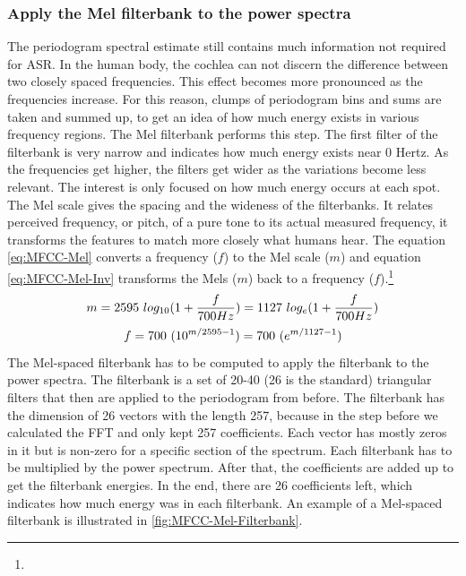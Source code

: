 \subsubsection{Apply the Mel filterbank to the power spectra}
The periodogram spectral estimate still contains much information not required for \gls{ASR}. In the human body, the cochlea can not discern the difference between two closely spaced frequencies. This effect becomes more pronounced as the frequencies increase. For this reason, clumps of periodogram bins and sums are taken and summed up, to get an idea of how much energy exists in various frequency regions.
\newline
\newline
The Mel filterbank performs this step. The first filter of the filterbank is very narrow and indicates how much energy exists near 0 Hertz. As the frequencies get higher, the filters get wider as the variations become less relevant. The interest is only focused on how much energy occurs at each spot. The Mel scale gives the spacing and the wideness of the filterbanks. It relates perceived frequency, or pitch, of a pure tone to its actual measured frequency, it transforms the features to match more closely what humans hear. The equation \ref{eq:MFCC-Mel} converts a frequency ($f$) to the Mel scale ($m$) and equation \ref{eq:MFCC-Mel-Inv} transforms the Mels ($m$) back to a frequency ($f$).\footnote{}
\begin{equation}
    \centering
    m = 2595 \ log_{10}(1 + \frac{f}{700Hz}) = 1127 \ log_e(1 + \frac{f}{700Hz})
    \label{eq:MFCC-Mel}
\end{equation}
\begin{equation}
    \centering
    f = 700 \ (10^{m/2595-1}) = 700 \ (e^{m/1127-1})
    \label{eq:MFCC-Mel-Inv}
\end{equation}
The Mel-spaced filterbank has to be computed to apply the filterbank to the power spectra. The filterbank is a set of 20-40 (26 is the standard) triangular filters that then are applied to the periodogram from before. The filterbank has the dimension of 26 vectors with the length 257, because in the step before we calculated the \gls{FFT} and only kept 257 coefficients. Each vector has mostly zeros in it but is non-zero for a specific section of the spectrum. Each filterbank has to be multiplied by the power spectrum. After that, the coefficients are added up to get the filterbank energies. In the end, there are 26 coefficients left, which indicates how much energy was in each filterbank. An example of a Mel-spaced filterbank is illustrated in \ref{fig:MFCC-Mel-Filterbank}.
